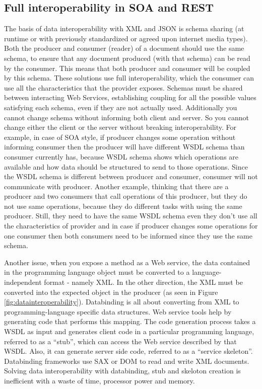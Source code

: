 \subsection{Full interoperability in SOA and REST}
\label{section:fullinteroperabilityProblem}

The basis of data interoperability with XML and JSON is schema sharing (at runtime or with previously standardized or agreed upon internet media types). Both the producer and consumer (reader) of a document should use the same schema, to ensure that any document produced (with that schema) can be read by the consumer. This means that both producer and consumer will be coupled by this schema. These solutions use full interoperability, which the consumer can use all the characteristics that the provider exposes. Schemas must be shared between interacting Web Services, establishing coupling for all the possible values satisfying each schema, even if they are not actually used. Additionally you cannot change schema without informing both client and server. So you cannot change either the client or the server without breaking interoperability. For example, in case of SOA style, if producer changes some operation without informing consumer then the producer will have different WSDL schema than consumer currently has, because WSDL schema shows which operations are available and how data should be structured to send to those operations. Since the WSDL schema is different between producer and consumer, consumer will not communicate with producer. Another example, thinking that there are a producer and two consumers that call operations of this producer, but they do not use same operations, because they do different tasks with using the same producer. Still, they need to have the same WSDL schema even they don't use all the characteristics of provider and in case if producer changes some operations for one consumer then both consumers need to be informed since they use the same schema.

Another issue, when you expose a method as a Web service, the data contained in the programming language object must be converted to a language-independent format - namely XML. In the other direction, the XML must be converted into the expected  object in the producer (as seen in Figure \ref{fig:datainteroperability}). Databinding is all about converting from XML to programming-language specific data structures. Web service tools help by generating code that performs this mapping. The code generation process takes a WSDL as input and generates client code in a particular programming language, referred to as a “stub”, which can access the Web service described by that WSDL. Also, it can generate server side code, referred to as a “service skeleton”. Databinding frameworks use SAX or DOM to read and write XML documents. Solving data interoperability with databinding, stub and skeloton creation is inefficient with a waste of time, processor power and memory.

